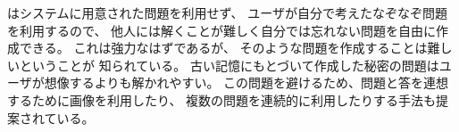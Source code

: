 \documentclass[twoside]{wiss}
\begin{document}
{\EP}はシステムに用意された問題を利用せず、
ユーザが自分で考えたなぞなぞ問題を利用するので、
他人には解くことが難しく自分では忘れない問題を自由に作成できる。
これは強力なはずであるが、
そのような問題を作成することは難しいということが
知られている\cite{Just:2009:PCC:1572532.1572543}\cite{Schechter:2009:NSM:1607723.1608145}。
%
%
%
古い記憶にもとづいて作成した秘密の問題はユーザが想像するよりも解かれやすい。
この問題を避けるため、問題と答を連想するために画像を利用したり、
複数の問題を連続的に利用したりする手法も提案されている\cite{Renaud:2010:PQE:2146303.2146318}。





\end{document}
